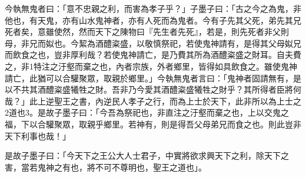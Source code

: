 \begin{pinyinscope}
今執無鬼者曰：「意不忠親之利，而害為孝子乎？」子墨子曰：「古之今之為鬼，非他也，有天鬼，亦有山水鬼神者，亦有人死而為鬼者。今有子先其父死，弟先其兄死者矣，意雖使然，然而天下之陳物曰『先生者先死』，若是，則先死者非父則母，非兄而姒也。今絜為酒醴粢盛，以敬慎祭祀，若使鬼神請有，是得其父母姒兄而飲食之也，豈非厚利哉？若使鬼神請亡，是乃費其所為酒醴粢盛之財耳。自夫費之，非1特注之汙壑而棄之也，內者宗族，外者鄉里，皆得如具飲食之。雖使鬼神請亡，此猶可以合驩聚眾，取親於鄉里。」今執無鬼者言曰：「鬼神者固請無有，是以不共其酒醴粢盛犧牲之財。吾非乃今愛其酒醴粢盛犧牲之財乎？其所得者臣將何哉？」此上逆聖王之書，內逆民人孝子之行，而為上士於天下，此非所以為上士之2道也3。是故子墨子曰：「今吾為祭祀也，非直注之汙壑而棄之也，上以交鬼之福，下以合驩聚眾，取親乎鄉里。若神有，則是得吾父母弟兄而食之也。則此豈非天下利事也哉！」

是故子墨子曰：「今天下之王公大人士君子，中實將欲求興天下之利，除天下之害，當若鬼神之有也，將不可不尊明也，聖王之道也」。


\end{pinyinscope}